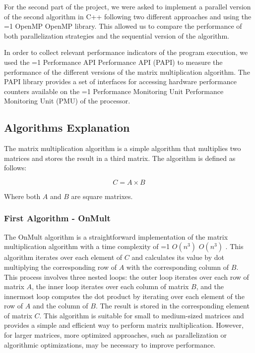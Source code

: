 \documentclass[11pt,a4paper]{article}
\newcommand{\hl}[2][1]{%
  \ifnum#1=1\relax
    \textcolor{text-hl1}{#2}%
  \else
    \textcolor{text-hl2}{#2}%
  \fi
}
\begin{document}
For the second part of the project, we were asked to implement a parallel version of the second 
algorithm in C++ following two different approaches and using the \hl{OpenMP} library. This allowed 
us to compare the performance of both parallelization strategies and the sequential version of 
the algorithm.

In order to collect relevant performance indicators of the program execution, we used the 
\hl{Performance API} (PAPI) to measure the performance of the different versions of the matrix
multiplication algorithm. The PAPI library provides a set of interfaces for accessing hardware
performance counters available on the \hl[2]{Performance Monitoring Unit} (PMU) of the processor.


\subsection{Algorithms Explanation}
The matrix multiplication algorithm is a simple algorithm that multiplies two matrices and 
stores the result in a third matrix. The algorithm is defined as follows:

\begin{equation}
    C = A \times B
\end{equation}

\centerline{Where both $A$ and $B$ are square matrixes.}

\subsubsection{First Algorithm - OnMult}

The OnMult algorithm is a straightforward implementation of the matrix multiplication algorithm 
with a time complexity of \hl{$O(n^3)$}. This algorithm iterates over each element of $C$ 
and calculates its value by dot multiplying the corresponding row of $A$ with the 
corresponding column of $B$.
This process involves three nested loops: the outer loop iterates over each row of 
matrix $A$, the inner loop iterates over each column of matrix $B$, and the innermost 
loop computes the dot product by iterating over each element of the row of $A$ and the 
column of $B$. The result is stored in the corresponding element of matrix $C$. This 
algorithm is suitable for small to medium-sized matrices and provides a simple and 
efficient way to perform matrix multiplication. However, for larger matrices, more 
optimized approaches, such as parallelization or algorithmic optimizations, may be 
necessary to improve performance.
\end{document}
